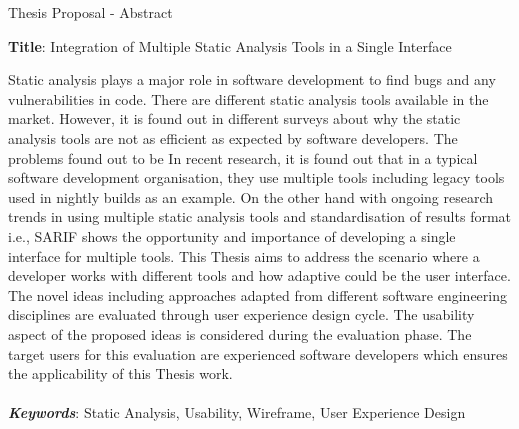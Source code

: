 \documentclass{article}
\begin{document}
	
	\begin{center}
		Thesis Proposal - Abstract 
	\end{center}

\begin{center}
	\textbf{Title}: Integration of Multiple Static Analysis Tools in a Single Interface \\
\end{center}	

Static analysis plays a major role in software development to find bugs and any vulnerabilities in code. There are different static analysis tools available in the market. However, it is found out in different surveys about why the static analysis tools are not as efficient as expected by software developers. The problems found out to be  In recent research, it is found out that in a typical software development organisation, they use multiple tools including legacy tools used in nightly builds as an example. On the other hand with ongoing research trends in using multiple static analysis tools and standardisation of results format i.e., SARIF shows the opportunity and importance of developing a single interface for multiple tools. This Thesis aims to address the scenario where a developer works with different tools and how adaptive could be the user interface. The novel ideas including approaches adapted from different software engineering disciplines are evaluated through user experience design cycle. The usability aspect of the proposed ideas is considered during the evaluation phase. The target users for this evaluation are experienced software developers which ensures the applicability of this Thesis work. \\ \\
\textbf{\textit{Keywords}}: Static Analysis, Usability, Wireframe, User Experience Design
	
\end{document}

